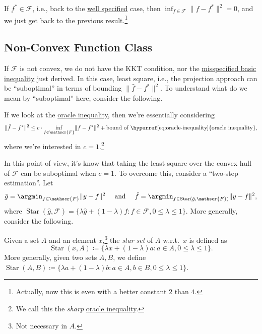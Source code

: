 \begin{remark}
	If \(f^{\ast} \in \mathscr{F} \), i.e., back to the \hyperref[def:well-specified]{well specified} case, then \(\inf _{f\in \mathscr{F} } \lVert f - f^{\ast} \rVert ^2 = 0\), and we just get back to the previous result.\footnote{Actually, now this is even with a better constant \(2\) than \(4\).}
\end{remark}

\subsection{Non-Convex Function Class}
If \(\mathscr{F} \) is not convex, we do not have the KKT condition, nor the \hyperref[eq:misspecified-convex-basic-inequality]{misspecified basic inequality} just derived. In this case, least square, i.e., the projection approach can be ``suboptimal'' in terms of bounding \(\lVert \hat{f} - f^{\ast} \rVert ^2\). To understand what do we mean by ``suboptimal'' here, consider the following.

\begin{intuition}
	If we look at the \hyperref[eq:oracle-inequality]{oracle inequality}, then we're essentially considering
	\[
		\lVert \hat{f} - f^{\ast}  \rVert ^2 \leq c \cdot \inf _{f\in \mathscr{F} } \lVert f - f^{\ast}  \rVert ^2 + \text{bound of \hyperref[eq:oracle-inequality]{oracle inequality}},
	\]
	where we're interested in \(c = 1\).\footnote{We call this the \emph{sharp} \hyperref[eq:oracle-inequality]{oracle inequality}.}
\end{intuition}

In this point of view, it's know that taking the least square over the convex hull of \(\mathscr{F} \) can be suboptimal when \(c = 1\). To overcome this, consider a ``two-step estimation''. Let
\[
	\hat{g} = \argmin_{f\in \mathscr{F} } \lVert y - f \rVert ^2
	\quad\text{ and }\quad
	\hat{f} = \argmin_{f\in \mathop{\mathrm{Star}}(\hat{g} , \mathscr{F} ) } \lVert y - f \rVert ^2,
\]
where \(\mathop{\mathrm{Star}}(\hat{g} , \mathscr{F} ) = \{ \lambda \hat{g} + (1 - \lambda ) f \colon f\in \mathscr{F} , 0 \leq \lambda \leq 1 \} \). More generally, consider the following.

\begin{definition}\label{def:star-set}
	Given a set \(A\) and an element \(x\),\footnote{Not necessary in \(A\).} the \emph{star set} of \(A\) w.r.t.\ \(x\) is defined as
	\[
		\mathop{\mathrm{Star}}(x, A) \coloneqq \{ \lambda x + (1 - \lambda ) a \colon a\in A , 0 \leq \lambda \leq 1 \}.
	\]
	More generally, given two sets \(A, B\), we define \(\mathop{\mathrm{Star}}(A, B) \coloneqq \{ \lambda a + (1 - \lambda ) b \colon a\in A , b\in B, 0 \leq \lambda \leq 1 \}\).
\end{definition}


